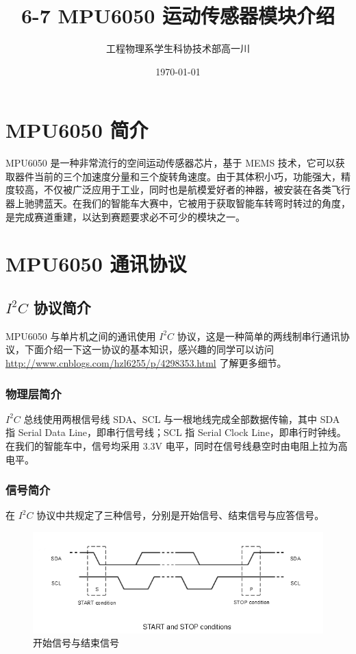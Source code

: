
\graphicspath{{./img/mpu/}{./img/}}




\title{6-7 MPU6050 运动传感器模块介绍}
\author{工程物理系学生科协技术部\quad 高一川}
\date{\today}
\maketitle
\tableofcontents
\newpage

\section{MPU6050 简介}

MPU6050 是一种非常流行的空间运动传感器芯片，基于 MEMS 技术，它可以获取器件当前的三个加速度分量和三个旋转角速度。由于其体积小巧，功能强大，精度较高，不仅被广泛应用于工业，同时也是航模爱好者的神器，被安装在各类飞行器上驰骋蓝天。在我们的智能车大赛中，它被用于获取智能车转弯时转过的角度，是完成赛道重建，以达到赛题要求必不可少的模块之一。

\section{MPU6050 通讯协议}
\subsection{\texorpdfstring{$I^2C$}{I2C} 协议简介}
MPU6050 与单片机之间的通讯使用 $I^2C$ 协议，这是一种简单的两线制串行通讯协议，下面介绍一下这一协议的基本知识，感兴趣的同学可以访问 \href{http://www.cnblogs.com/hzl6255/p/4298353.html}{http://www.cnblogs.com/hzl6255/p/4298353.html} 了解更多细节。

\subsubsection{物理层简介}
$I^2C$ 总线使用两根信号线 SDA、SCL 与一根地线完成全部数据传输，其中 SDA 指 Serial Data Line，即串行信号线；SCL 指 Serial Clock Line，即串行时钟线。在我们的智能车中，信号均采用 3.3V 电平，同时在信号线悬空时由电阻上拉为高电平。

\subsubsection{信号简介}
在 $I^2C$ 协议中共规定了三种信号，分别是开始信号、结束信号与应答信号。

\begin{figure}[h]
\centering %
\includegraphics[width=.8\textwidth]{i2c_startstop.png}
\caption{开始信号与结束信号}
\label{i2c_startstop}
\end{figure}

